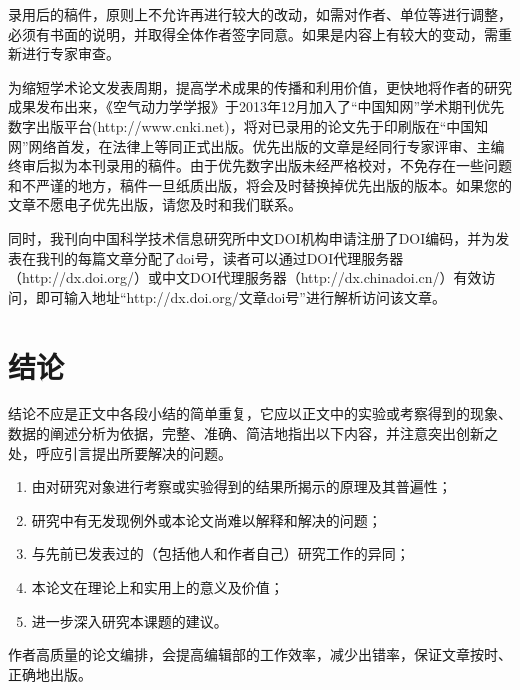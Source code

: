 \documentclass{kqdlxxb}
\begin{document}
录用后的稿件，原则上不允许再进行较大的改动，如需对作者、单位等进行调整，必须有书面的说明，并取得全体作者签字同意。如果是内容上有较大的变动，需重新进行专家审查。

为缩短学术论文发表周期，提高学术成果的传播和利用价值，更快地将作者的研究成果发布出来，《空气动力学学报》于2013年12月加入了“中国知网”学术期刊优先数字出版平台(http://www.cnki.net)，将对已录用的论文先于印刷版在“中国知网”网络首发，在法律上等同正式出版。优先出版的文章是经同行专家评审、主编终审后拟为本刊录用的稿件。由于优先数字出版未经严格校对，不免存在一些问题和不严谨的地方，稿件一旦纸质出版，将会及时替换掉优先出版的版本。如果您的文章不愿电子优先出版，请您及时和我们联系。

同时，我刊向中国科学技术信息研究所中文DOI机构申请注册了DOI编码，并为发表在我刊的每篇文章分配了doi号，读者可以通过DOI代理服务器（http://dx.doi.org/）或中文DOI代理服务器（http://dx.chinadoi.cn/）有效访问，即可输入地址“http://dx.doi.org/文章doi号”进行解析访问该文章。

\section{结论}
结论不应是正文中各段小结的简单重复，它应以正文中的实验或考察得到的现象、数据的阐述分析为依据，完整、准确、简洁地指出以下内容，并注意突出创新之处，呼应引言提出所要解决的问题。

\begin{enumerate}[label=\arabic*{)}]
    \item 由对研究对象进行考察或实验得到的结果所揭示的原理及其普遍性； 
    \item  研究中有无发现例外或本论文尚难以解释和解决的问题；
    \item  与先前已发表过的（包括他人和作者自己）研究工作的异同；
    \item  本论文在理论上和实用上的意义及价值；
    \item  进一步深入研究本课题的建议。
\end{enumerate}

作者高质量的论文编排，会提高编辑部的工作效率，减少出错率，保证文章按时、正确地出版。






\printbibliography[heading=bibintoc]
\end{document}
